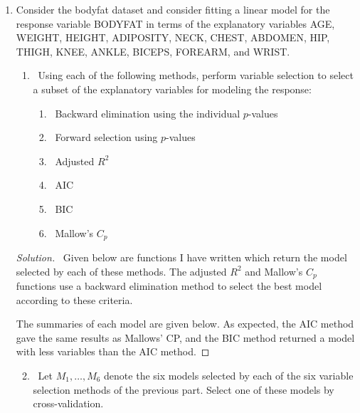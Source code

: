 \documentclass[12pt]{article}
\begin{document}
\begin{enumerate}[leftmargin=0cm,itemindent=.5cm,labelwidth=\itemindent,labelsep=0cm,align=left]

\item Consider the bodyfat dataset and consider fitting a linear model for the response variable BODYFAT in terms of the explanatory variables AGE, WEIGHT, HEIGHT, ADIPOSITY, NECK, CHEST, ABDOMEN, HIP, THIGH, KNEE, ANKLE, BICEPS, FOREARM, and WRIST.
\begin{enumerate}
\item \ Using each of the following methods, perform variable selection to select a subset of the explanatory variables for modeling the response:
\begin{enumerate}
\item \ Backward elimination using the individual $p$-values
\item \ Forward selection using $p$-values
\item \ Adjusted $R^2$
\item \ AIC
\item \ BIC
\item \ Mallow's $C_p$
\end{enumerate}
\end{enumerate}





\begin{proof}[Solution]
\ Given below are functions I have written which return the model selected by each of these methods.  The adjusted $R^2$ and Mallow's $C_p$ functions use a backward elimination method to select the best model according to these criteria.

The summaries of each model are given below.  As expected, the AIC method gave the same results as Mallows' CP, and the BIC method returned a model with less variables than the AIC method.


\end{proof}







\begin{enumerate}
\setcounter{enumii}{1}
\item \ Let $M_1, \dots , M_6$ denote the six models selected by each of the six variable selection methods of the previous part.  Select one of these models by cross-validation.
\end{enumerate}



\end{enumerate}
\end{document}
